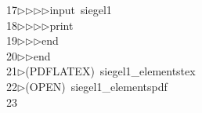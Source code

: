 \begin{tabbing}
17\>$\triangleright$\>$\triangleright$\>$\triangleright$\>$\triangleright$\>input\ siegel1\ \\[0pt]
18\>$\triangleright$\>$\triangleright$\>$\triangleright$\>$\triangleright$\>print\ \\[0pt]
19\>$\triangleright$\>$\triangleright$\>$\triangleright$\>end\ \\[0pt]
20\>$\triangleright$\>$\triangleright$\>end\\[0pt]
21\>$\triangleright$\>(PDFLATEX)\ siegel1\_elementstex\\[0pt]
22\>$\triangleright$\>(OPEN)\ siegel1\_elementspdf\\[0pt]
23\>\end{tabbing}
